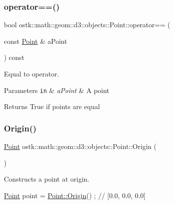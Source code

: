 \subsubsection{\texorpdfstring{operator==()}{operator==()}}
{\footnotesize\ttfamily bool ostk\+::math\+::geom\+::d3\+::objects\+::\+Point\+::operator== (\begin{DoxyParamCaption}\item[{const \hyperlink{classostk_1_1math_1_1geom_1_1d3_1_1objects_1_1_point}{Point} \&}]{a\+Point }\end{DoxyParamCaption}) const}



Equal to operator. 


\begin{DoxyParams}[1]{Parameters}
\mbox{\tt in}  & {\em a\+Point} & A point \\
\hline
\end{DoxyParams}
\begin{DoxyReturn}{Returns}
True if points are equal 
\end{DoxyReturn}
\mbox{\label{classostk_1_1math_1_1geom_1_1d3_1_1objects_1_1_point_a079c199f08b015d456d02728a71b534c}} 
\subsubsection{\texorpdfstring{Origin()}{Origin()}}
{\footnotesize\ttfamily \hyperlink{classostk_1_1math_1_1geom_1_1d3_1_1objects_1_1_point}{Point} ostk\+::math\+::geom\+::d3\+::objects\+::\+Point\+::\+Origin (\begin{DoxyParamCaption}{ }\end{DoxyParamCaption})\hspace{0.3cm}{\ttfamily [static]}}



Constructs a point at origin. 


\begin{DoxyCode}
\hyperlink{classostk_1_1math_1_1geom_1_1d3_1_1objects_1_1_point_ad9bee5dadb878200f859b20a34680ae5}{Point} point = \hyperlink{classostk_1_1math_1_1geom_1_1d3_1_1objects_1_1_point_a079c199f08b015d456d02728a71b534c}{Point::Origin}() ; \textcolor{comment}{// [0.0, 0.0, 0.0]}
\end{DoxyCode}


